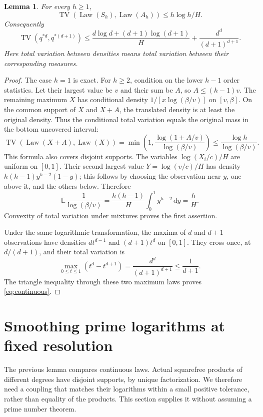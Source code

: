 \documentclass[11pt]{article}
\newtheorem{lemma}[theorem]{Lemma}
\theoremstyle{remark}\newtheorem{remark}[theorem]{Remark}
\DeclareMathOperator{\TV}{TV}
\DeclareMathOperator{\Law}{Law}
\newcommand{\E}{\mathbb E}
\newcommand{\dd}{\,\mathrm d}
\begin{document}
\begin{lemma}\label{lem:continuous}
For every $h\ge1$,
\[
 \TV(\Law(S_h),\Law(A_h))\le h\log h/H.
\]
Consequently
\begin{equation}\label{eq:continuous}
 \TV(q^{*d},q^{*(d+1)})
 \le\frac{d\log d+(d+1)\log(d+1)}H
       +\frac{d^d}{(d+1)^{d+1}}.
\end{equation}
Here total variation between densities means total variation between their corresponding measures.
\end{lemma}
\begin{proof}
The case $h=1$ is exact. For $h\ge2$, condition on the lower $h-1$ order statistics. Let their largest value be $v$ and their sum be $A$, so $A\le(h-1)v$. The remaining maximum $X$ has conditional density $1/[x\log(\beta/v)]$ on $[v,\beta]$. On the common support of $X$ and $X+A$, the translated density is at least the original density. Thus the conditional total variation equals the original mass in the bottom uncovered interval:
\[
 \TV(\Law(X+A),\Law(X))
 =\min\left(1,\frac{\log(1+A/v)}{\log(\beta/v)}\right)
 \le\frac{\log h}{\log(\beta/v)}.
\]
This formula also covers disjoint supports. The variables $\log(X_i/c)/H$ are uniform on $[0,1]$. Their second largest value $Y=\log(v/c)/H$ has density $h(h-1)y^{h-2}(1-y)$; this follows by choosing the observation near $y$, one above it, and the others below. Therefore
\[
 \E\frac1{\log(\beta/v)}
 =\frac{h(h-1)}H\int_0^1y^{h-2}\dd y=\frac hH.
\]
Convexity of total variation under mixtures proves the first assertion.

Under the same logarithmic transformation, the maxima of $d$ and $d+1$ observations have densities $dt^{d-1}$ and $(d+1)t^d$ on $[0,1]$. They cross once, at $d/(d+1)$, and their total variation is
\[
 \max_{0\le t\le1}(t^d-t^{d+1})=\frac{d^d}{(d+1)^{d+1}}\le\frac1{d+1}.
\]
The triangle inequality through these two maximum laws proves \eqref{eq:continuous}.
\end{proof}

\section{Smoothing prime logarithms at fixed resolution}

The previous lemma compares continuous laws. Actual squarefree products of different degrees have disjoint supports, by unique factorization. We therefore need a coupling that matches their logarithms within a small positive tolerance, rather than equality of the products. This section supplies it without assuming a prime number theorem.
\end{document}
